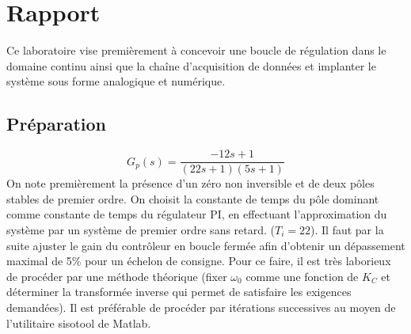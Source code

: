 



\label{s:experimentation}
\chapter{Rapport}
\label{cha:projet}
Ce laboratoire vise premièrement à concevoir une boucle de régulation dans le domaine continu ainsi que la chaîne d'acquisition de données et implanter le système sous forme analogique et numérique.
\section{Préparation}
\begin{equation}
	G_p(s) = \frac{-12s + 1}{(22s +1)(5s+1)}
\end{equation}
On note premièrement la présence d'un zéro non inversible et de deux pôles stables de premier ordre. On choisit la constante de temps du pôle dominant comme constante de temps du régulateur PI, en effectuant l'approximation du système par un système de premier ordre sans retard. ($T_i = 22$). Il faut par la suite ajuster le gain du contrôleur en boucle fermée afin d'obtenir un dépassement maximal de 5\% pour un échelon de consigne. Pour ce faire, il est très laborieux de procéder par une méthode théorique (fixer $\omega_0$ comme une fonction de $K_C$ et déterminer la transformée inverse qui permet de satisfaire les exigences demandées). Il est préférable de procéder par itérations successives au moyen de l'utilitaire sisotool de Matlab. 
